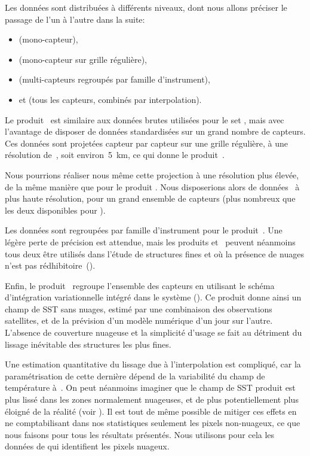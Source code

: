 Les données sont distribuées à différents niveaux, dont nous allons préciser le passage de l'un à l'autre dans la suite:
\begin{itemize}
  \item {} (mono-capteur),
  \item {} (mono-capteur sur grille régulière),
  \item {} (multi-capteurs regroupés par famille d'instrument),
  \item et  (tous les capteurs, combinés par interpolation).
\end{itemize}

Le produit~ est similaire aux données brutes utilisées pour le set , mais avec l'avantage de disposer de données standardisées sur un grand nombre de capteurs.
Ces données sont projetées capteur par capteur sur une grille régulière, à une résolution de~, soit environ~\qty{5}{\km}, ce qui donne le produit~.

\begin{note}
  Nous pourrions réaliser nous même cette projection à une résolution plus élevée, de la même manière que pour le produit .
  Nous disposerions alors de données~ à plus haute résolution, pour un grand ensemble de capteurs (plus nombreux que les deux disponibles pour ).
\end{note}

Les données sont regroupées par famille d'instrument pour le produit~. Une légère perte de précision est attendue, mais les produits  et~ peuvent néanmoins tous deux être utilisés dans l'étude de structures fines et où la présence de nuages n'est pas rédhibitoire~(\cite{merchant_2019}).

Enfin, le produit~ regroupe l'ensemble des capteurs en utilisant le schéma d'intégration variationnelle  intégré dans le système  (\cite{good_2020}).
Ce produit donne ainsi un champ de SST sans nuages, estimé par une combinaison des observations satellites, et de la prévision d'un modèle numérique d'un jour sur l'autre.
L'absence de couverture nuageuse et la simplicité d'usage se fait au détriment du lissage inévitable des structures les plus fines.

Une estimation quantitative du lissage due à l'interpolation est compliqué, car la paramétrisation de cette dernière dépend de la variabilité du champ de température à~.
On peut néanmoins imaginer que le champ de SST produit est plus lissé dans les zones normalement nuageuses, et de plus potentiellement plus éloigné de la réalité (voir ).
Il est tout de même possible de mitiger ces effets en ne comptabilisant dans nos statistiques seulement les pixels non-nuageux, ce que nous faisons pour tous les résultats présentés.
Nous utilisons pour cela les données de  qui identifient les pixels nuageux.

